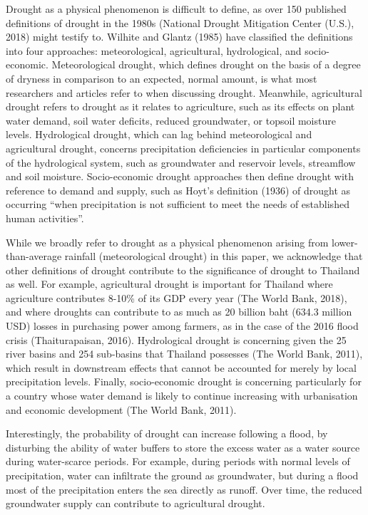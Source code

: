 Drought as a physical phenomenon is difficult to define, as over 150 published definitions of drought in the 1980s (National Drought Mitigation Center (U.S.), 2018) might testify to. Wilhite and Glantz (1985) have classified the definitions into four approaches: meteorological, agricultural, hydrological, and socio-economic. Meteorological drought, which defines drought on the basis of a degree of dryness in comparison to an expected, normal amount, is what most researchers and articles refer to when discussing drought. Meanwhile, agricultural drought refers to drought as it relates to agriculture, such as its effects on plant water demand, soil water deficits, reduced groundwater, or topsoil moisture levels. Hydrological drought, which can lag behind meteorological and agricultural drought, concerns precipitation deficiencies in particular components of the hydrological system, such as groundwater and reservoir levels, streamflow and soil moisture. Socio-economic drought approaches then define drought with reference to demand and supply, such as Hoyt’s definition (1936) of drought as occurring “when precipitation is not sufficient to meet the needs of established human activities”. 

While we broadly refer to drought as a physical phenomenon arising from lower-than-average rainfall (meteorological drought) in this paper, we acknowledge that other definitions of drought contribute to the significance of drought to Thailand as well. For example, agricultural drought is important for Thailand where agriculture contributes 8-10\% of its GDP every year (The World Bank, 2018), and where droughts can contribute to as much as 20 billion baht (634.3 million USD) losses in purchasing power among farmers, as in the case of the 2016 flood crisis (Thaiturapaisan, 2016). Hydrological drought is concerning given the 25 river basins and 254 sub-basins that Thailand possesses (The World Bank, 2011), which result in downstream effects that cannot be accounted for merely by local precipitation levels. Finally, socio-economic drought is concerning particularly for a country whose water demand is likely to continue increasing with urbanisation and economic development (The World Bank, 2011).

Interestingly, the probability of drought can increase following a flood, by disturbing the ability of water buffers to store the excess water as a water source during water-scarce periods. For example, during periods with normal levels of precipitation, water can infiltrate the ground as groundwater, but during a flood most of the precipitation enters the sea directly as runoff. Over time, the reduced groundwater supply can contribute to agricultural drought.

